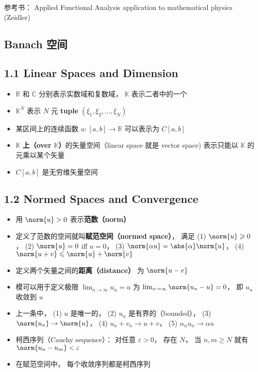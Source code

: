 
参考书： Applied Functional Analysis application to mathematical physics (Zeidler)

\subsection{Banach 空间}

\subsection{1.1 Linear Spaces and Dimension}
\begin{itemize}
\item $\mathbb R$ 和 $\mathbb C$ 分别表示实数域和复数域， $\mathbb K$ 表示二者中的一个

\item $\mathbb K^N$ 表示 $N$ 元 \textbf{tuple} $(\xi_1, \xi_2, \dots, \xi_N)$

\item 某区间上的连续函数 $u:[a, b] \to \mathbb{R}$ 可以表示为 $C[a, b]$

\item $\mathbb{K}$ \textbf{上（over $\mathbb K$）}的矢量空间（linear space 就是 vector space) 表示只能以 $\mathbb K$ 的元乘以某个矢量

\item $C[a, b]$ 是无穷维矢量空间
\end{itemize}

\subsection{1.2 Normed Spaces and Convergence}
\begin{itemize}
\item 用 $\norm{u} > 0$ 表示\textbf{范数（norm）}

\item 定义了范数的空间就叫\textbf{赋范空间（normed space）}， 满足 (1) $\norm{u} \geqslant 0$， (2) $\norm{u} = 0$ iff $u = 0$， (3) $\norm{\alpha u} = \abs{\alpha} \norm{u}$， (4) $\norm{u + v} \leqslant \norm{u} + \norm{v}$

\item 定义两个矢量之间的\textbf{距离（distance）} 为 $\norm{u - v}$

\item 模可以用于定义极限 $\lim_{n\to\infty} u_n = u$ 为 $\lim_{n\to\infty} \norm{u_n - u} = 0$， 即 $u_n$ 收敛到 $u$

\item 上一条中， (1) $u$ 是唯一的， (2) $u_n$ 是有界的（bounded）， (3) $\norm{u_n} \to \norm{u}$， (4) $u_n + v_n \to u + v$， (5) $\alpha_n u_n \to \alpha u$

\item 柯西序列（Cauchy sequence）： 对任意 $\varepsilon > 0$， 存在 $N$， 当 $n, m \geqslant N$ 就有 $\norm{u_n - u_m} < \varepsilon$

\item 在赋范空间中， 每个收敛序列都是柯西序列
\end{itemize}

